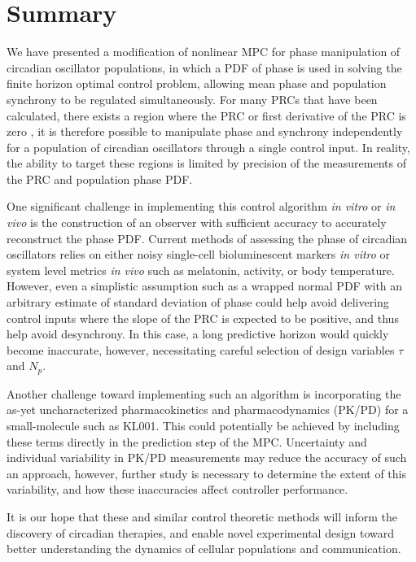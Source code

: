 \section{Summary\label{sec:conc}}
We have presented a modification of nonlinear MPC for phase manipulation of circadian oscillator populations, in which a PDF of phase is used in solving the finite horizon optimal control problem, allowing mean phase and population synchrony to be regulated simultaneously.
For many PRCs that have been calculated, there exists a region where the PRC or first derivative of the PRC is zero \cite{Dunlap2004}, it is therefore possible to manipulate phase and synchrony independently for a population of circadian oscillators through a single control input.
In reality, the ability to target these regions is limited by precision of the measurements of the PRC and population phase PDF.

One significant challenge in implementing this control algorithm \textit{in vitro} or \textit{in vivo} is the construction of an observer with sufficient accuracy to accurately reconstruct the phase PDF.
Current methods of assessing the phase of circadian oscillators relies on either noisy single-cell bioluminescent markers \textit{in vitro} or system level metrics \textit{in vivo} such as melatonin, activity, or body temperature.
However, even a simplistic assumption such as a wrapped normal PDF with an arbitrary estimate of standard deviation of phase could help avoid delivering control inputs where the slope of the PRC is expected to be positive, and thus help avoid desynchrony.
In this case, a long predictive horizon would quickly become inaccurate, however, necessitating careful selection of design variables $\tau$ and $N_p$.

Another challenge toward implementing such an algorithm is incorporating the as-yet uncharacterized pharmacokinetics and pharmacodynamics (PK/PD) for a small-molecule such as KL001.
This could potentially be achieved by including these terms directly in the prediction step of the MPC.
Uncertainty and individual variability in PK/PD measurements may reduce the accuracy of such an approach, however, further study is necessary to determine the extent of this variability, and how these inaccuracies affect controller performance.

It is our hope that these and similar control theoretic methods will inform the discovery of circadian therapies, and enable novel experimental design toward better understanding the dynamics of cellular populations and communication.














